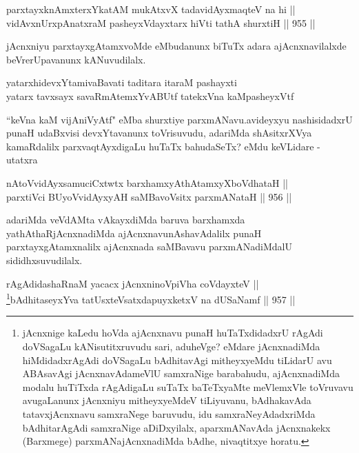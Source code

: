 \begin{shl}
parxtayxknAmxterxYkatAM mukAtxvX tadavidAyxmaqteV na hi || \\
vidAvxnUrxpAnatxraM pasheyxVdayxtarx hiVti tathA shurxtiH \hfill || 955 ||  
\end{shl}

\begin{artha}
jAcnxniyu parxtayxgAtamxvoMde eMbudanunx biTuTx adara ajAcnxnavilalxde beVrerUpavanunx kANuvudilalx.
\end{artha}
	
\begin{shl}
yatarxhidevxYtamivaBavati taditara itaraM pashayxti \\
yatarx tavxsayx savaRmAtemxYvABUtf tatekxVna kaMpasheyxVtf
\end{shl}	
	
\begin{artha}
``keVna kaM vijAniVyAtf" eMba shurxtiye parxmANavu.\break avideyxyu nashisidadxrU punaH udaBxvisi devxYtavanunx toVrisuvudu, adariMda shAsitxrXVya kamaRdalilx parxvaqtAyxdigaLu huTaTx bahudaSeTx? eMdu keVLidare - utatxra
\end{artha}

\begin{shl}
nAtoV\s vidAyxsamuciCxtwtx barxhamxyAthAtamxyXboVdhataH || \\
parxtiVci BUyoV\s vidAyxyAH saMBavoV\s sitx parxmANataH \hfill || 956 ||  
\end{shl}

\begin{artha}
adariMda veVdAMta vAkayxdiMda baruva barxhamxda yathAthaRjAcnxnadiMda ajAcnxnavunAshavAdalilx punaH parxtayxgAtamxnalilx ajAcnxnada saMBavavu parxmANadiMdalU sididhxsuvudilalx.
\end{artha}


\begin{shl}
rAgAdidashaRnaM yacacx jAcnxninoV\s piVha coVdayxteV || \\
\footnote{jAcnxnige kaLedu hoVda ajAcnxnavu punaH huTaTxdidadxrU rAgAdi doVSagaLu kANisutitxruvudu sari, aduheVge? eMdare jAcnxnadiMda hiMdidadxrAgAdi doVSagaLu bAdhitavAgi mitheyxyeMdu tiLidarU avu ABAsavAgi jAcnxnavAdameVlU samxraNige barabahudu, ajAcnxnadiMda modalu huTiTxda rAgAdigaLu suTaTx baTeTxyaMte meVlemxVle toVruvavu avugaLanunx jAcnxniyu mitheyxyeMdeV tiLiyuvanu, bAdhakavAda tatavxjAcnxnavu samxraNege baruvudu, idu samxraNeyAdadxriMda bAdhitarAgAdi samxraNige aDiDxyilalx, aparxmANavAda jAcnxnakekx (Barxmege) parxmANajAcnxnadiMda bAdhe, nivaqtitxye horatu.}bAdhitaseyxYva tatUsxteVsatxdapuyxketxV na dUSaNamf \hfill || 957 ||  
\end{shl}


